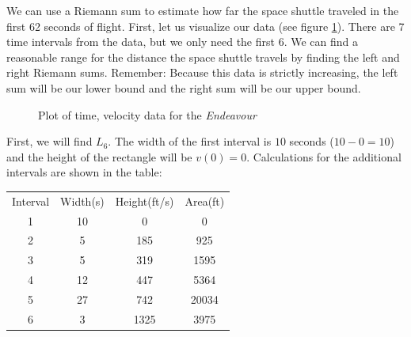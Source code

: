 We can use a Riemann sum to estimate how far the space shuttle traveled in the first 62 seconds of flight. First, let us visualize our data (see figure \ref{fig:endeavourscatter}). There are 7 time intervals from the data, but we only need the first 6. We can find a reasonable range for the distance the space shuttle travels by finding the left and right Riemann sums. Remember: Because this data is strictly increasing, the left sum will be our lower bound and the right sum will be our upper bound.

\begin{figure}[H]
	\centering
	\caption{Plot of time, velocity data for the \textit{Endeavour}}
	\label{fig:endeavourscatter}
\end{figure}

First, we will find $L_6$. The width of the first interval is $10$ seconds ($10-0=10$) and the height of the rectangle will be $v(0) = 0$. Calculations for the additional intervals are shown in the table:
\begin{center}
	\begin{tabular}{c|c|c|c}
		Interval & Width(s) & Height(ft/s) & Area(ft) \\
		1        & 10       & 0            & 0        \\
		2        & 5        & 185          & 925      \\
		3        & 5        & 319          & 1595     \\
		4        & 12       & 447          & 5364     \\
		5        & 27       & 742          & 20034    \\
		6        & 3        & 1325         & 3975     \\
	\end{tabular}
\end{center}

